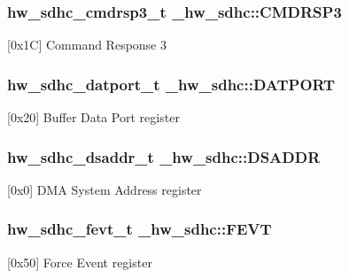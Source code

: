 \subsubsection[{\texorpdfstring{C\+M\+D\+R\+S\+P3}{CMDRSP3}}]{ {\bf hw\+\_\+sdhc\+\_\+cmdrsp3\+\_\+t} \+\_\+hw\+\_\+sdhc\+::\+C\+M\+D\+R\+S\+P3}\hypertarget{struct__hw__sdhc_a81f8055f023f46159a5b3d5fed2b79b8}{}\label{struct__hw__sdhc_a81f8055f023f46159a5b3d5fed2b79b8}
\mbox{[}0x1C\mbox{]} Command Response 3 
\subsubsection[{\texorpdfstring{D\+A\+T\+P\+O\+RT}{DATPORT}}]{ {\bf hw\+\_\+sdhc\+\_\+datport\+\_\+t} \+\_\+hw\+\_\+sdhc\+::\+D\+A\+T\+P\+O\+RT}\hypertarget{struct__hw__sdhc_a823efef94ba2a2722f56da955af8042c}{}\label{struct__hw__sdhc_a823efef94ba2a2722f56da955af8042c}
\mbox{[}0x20\mbox{]} Buffer Data Port register 
\subsubsection[{\texorpdfstring{D\+S\+A\+D\+DR}{DSADDR}}]{ {\bf hw\+\_\+sdhc\+\_\+dsaddr\+\_\+t} \+\_\+hw\+\_\+sdhc\+::\+D\+S\+A\+D\+DR}\hypertarget{struct__hw__sdhc_a2e715c1a0a6a3ce7a9c37ce9632ced3d}{}\label{struct__hw__sdhc_a2e715c1a0a6a3ce7a9c37ce9632ced3d}
\mbox{[}0x0\mbox{]} D\+MA System Address register 
\subsubsection[{\texorpdfstring{F\+E\+VT}{FEVT}}]{ {\bf hw\+\_\+sdhc\+\_\+fevt\+\_\+t} \+\_\+hw\+\_\+sdhc\+::\+F\+E\+VT}\hypertarget{struct__hw__sdhc_a026ea6c486e4a3e715b8d56fbbbc3a08}{}\label{struct__hw__sdhc_a026ea6c486e4a3e715b8d56fbbbc3a08}
\mbox{[}0x50\mbox{]} Force Event register 
